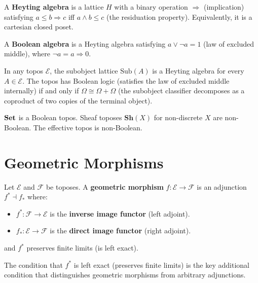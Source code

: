 \begin{definition}
A \textbf{Heyting algebra} is a lattice $H$ with a binary operation $\Rightarrow$ (implication) satisfying $a \leq b \Rightarrow c$ iff $a \wedge b \leq c$ (the residuation property). Equivalently, it is a cartesian closed poset.

A \textbf{Boolean algebra} is a Heyting algebra satisfying $a \vee \neg a = 1$ (law of excluded middle), where $\neg a = a \Rightarrow 0$.
\end{definition}

\begin{theorem}
In any topos $\mathcal{E}$, the subobject lattice $\mathrm{Sub}(A)$ is a Heyting algebra for every $A \in \mathcal{E}$. The topos has Boolean logic (satisfies the law of excluded middle internally) if and only if $\Omega \cong \Omega + \Omega$ (the subobject classifier decomposes as a coproduct of two copies of the terminal object).
\end{theorem}

\begin{corollary}
$\mathbf{Set}$ is a Boolean topos. Sheaf toposes $\mathbf{Sh}(X)$ for non-discrete $X$ are non-Boolean. The effective topos is non-Boolean.
\end{corollary}

\section{Geometric Morphisms}

\begin{definition}
Let $\mathcal{E}$ and $\mathcal{F}$ be toposes. A \textbf{geometric morphism} $f: \mathcal{E} \to \mathcal{F}$ is an adjunction $f^* \dashv f_*$ where:
\begin{itemize}
  \item $f^*: \mathcal{F} \to \mathcal{E}$ is the \textbf{inverse image functor} (left adjoint).
  \item $f_*: \mathcal{E} \to \mathcal{F}$ is the \textbf{direct image functor} (right adjoint).
\end{itemize}
and $f^*$ preserves finite limits (is left exact).
\end{definition}

\begin{remark}
The condition that $f^*$ is left exact (preserves finite limits) is the key additional condition that distinguishes geometric morphisms from arbitrary adjunctions.
\end{remark}

